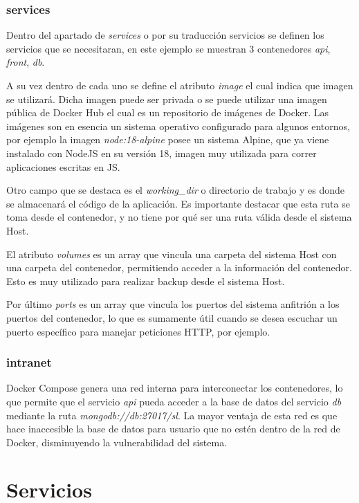 \subsubsection*{services}

Dentro del apartado de \textit{services} o por su traducción servicios se definen los servicios que se necesitaran, en este ejemplo se muestran 3 contenedores \textit{api}, \textit{front}, \textit{db}.

A su vez dentro de cada uno se define el atributo \textit{image} el cual indica que imagen se utilizará. Dicha imagen puede ser privada o  se puede utilizar una imagen pública de Docker Hub el cual es un repositorio de imágenes de Docker.
Las imágenes son en esencia un sistema operativo configurado para algunos entornos, por ejemplo la imagen \textit{node:18-alpine} posee un sistema Alpine, que ya viene instalado con NodeJS en su versión 18, imagen muy utilizada para correr aplicaciones escritas en JS.

Otro campo que se destaca es el \textit{working\_dir} o directorio de trabajo y es donde se almacenará el código de la aplicación. Es importante destacar que esta ruta se toma desde el contenedor, y no tiene por qué ser una ruta válida desde el sistema Host.

El atributo \textit{volumes} es un array que vincula una carpeta del sistema Host con una carpeta del contenedor, permitiendo acceder a la información del contenedor.
Esto es muy utilizado para realizar backup desde el sistema Host.

Por último \textit{ports} es un array que vincula los puertos del sistema anfitrión a los puertos del contenedor, lo que es sumamente útil cuando se desea escuchar un puerto específico para manejar peticiones HTTP, por ejemplo.

\subsubsection*{intranet}

Docker Compose genera una red interna para interconectar los contenedores, lo que permite que el servicio \textit{api} pueda acceder a la base de datos del servicio \textit{db} mediante la ruta \textit{mongodb://db:27017/sl}. La mayor ventaja de esta red es que hace inaccesible la base de datos para usuario que no estén dentro de la red de Docker, disminuyendo la vulnerabilidad del sistema.


\section{Servicios}

